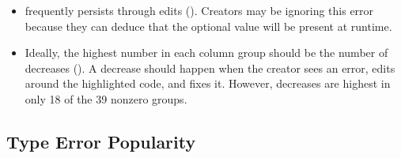 \documentclass[english,submission,cleveref]{programming}
\begin{document}
\begin{itemize}
  \item
     frequently persists through edits (\keepsym{}).
    Creators may be ignoring this error because they can deduce that the
    optional value will be present at runtime.

  \item
    Ideally, the highest number in each column group should
    be the number of decreases (\dropsym{}).
    A decrease should happen when the creator sees an error,
    edits around the highlighted code, and fixes it.
    However, decreases are highest in only 18 of the 39 nonzero groups.




\end{itemize}



\subsection{Type Error Popularity}
\label{s:type-error-count}
\end{document}

